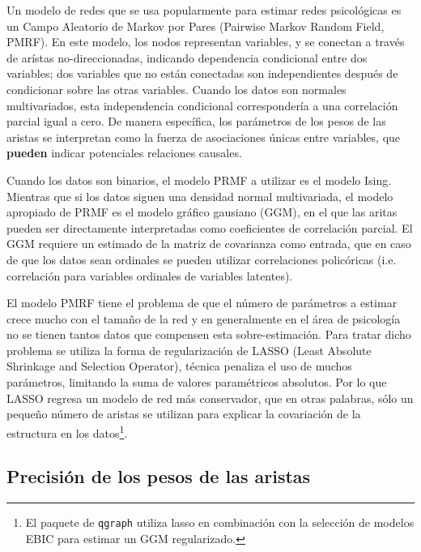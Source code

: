 \documentclass[11pt,spanish]{article}\usepackage[]{graphicx}\usepackage[]{color}
\begin{document}
Un modelo de redes que se usa popularmente para estimar redes psicológicas es un Campo Aleatorio de Markov por Pares (Pairwise Markov Random Field, PMRF). En este modelo, los nodos representan variables, y se conectan a través de arístas no-direccionadas, indicando dependencia condicional entre dos variables; dos variables que no están conectadas son independientes después de condicionar sobre las otras variables. Cuando los datos son normales multivariados, esta independencia condicional correspondería a una correlación parcial igual a cero. De manera específica, los parámetros de los pesos de las aristas se interpretan como la fuerza de asociaciones únicas entre variables, que {\bf pueden} indicar potenciales relaciones causales. 

Cuando los datos son binarios, el modelo PRMF a utilizar es el modelo Ising. Mientras que si los datos siguen una densidad normal multivariada, el modelo apropiado de PRMF es el modelo gráfico gausiano (GGM), en el que las aritas pueden ser directamente interpretadas como coeficientes de correlación parcial. El GGM requiere un estimado de la matriz de covarianza como entrada, que en caso de que los datos sean ordinales se pueden utilizar correlaciones policóricas (i.e. correlación para variables ordinales de variables latentes).

El modelo PMRF tiene el problema de que el número de parámetros a estimar crece mucho con el tamaño de la red y en generalmente en el área de psicología no se tienen tantos datos que compensen esta sobre-estimación. Para tratar dicho problema se utiliza la forma de regularización de LASSO (Least Absolute Shrinkage and Selection Operator), técnica penaliza el uso de muchos parámetros, limitando la suma de valores paramétricos absolutos. Por lo que LASSO regresa un modelo de red más conservador, que en otras palabras, sólo un pequeño número de aristas se utilizan para explicar la covariación de la estructura en los datos\footnote{El paquete de \texttt{qgraph} \citep{packageqgraph, bootnet} utiliza lasso en combinación con la selección de modelos EBIC para estimar un GGM regularizado.}. 


\subsection{Precisión de los pesos de las aristas}
\end{document}
